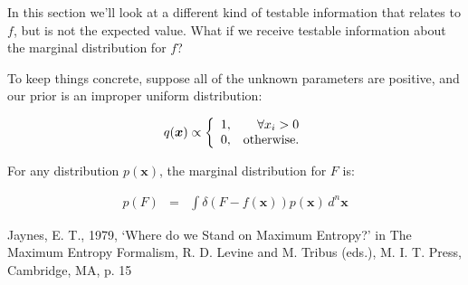 \documentclass[letterpaper, 11pt]{article}
\begin{document}
In this section we'll look at a different kind of testable information that
relates to $f$, but is not the expected value. What if we receive testable
information about the marginal distribution for $f$?

To keep things concrete, suppose all of the unknown parameters are positive,
and our prior is an improper uniform distribution:

\begin{eqnarray}
q(\boldsymbol{x}) \propto
\left\{
\begin{array}{lr}
1, & \forall x_i > 0\\
0, & \textnormal{otherwise}.
\end{array}
\right.
\end{eqnarray}

For any distribution $p(\boldsymbol{x})$, the marginal distribution for $F$ is:

\begin{eqnarray}
p(F) &=& \int \delta\left(F - f(\boldsymbol{x})\right)p(\boldsymbol{x}) \, d^n \boldsymbol{x}
\end{eqnarray}

\begin{thebibliography}{}
Jaynes, E. T., 1979, `Where do we Stand on Maximum Entropy?' in The Maximum Entropy Formalism, R. D. Levine and M. Tribus (eds.), M. I. T. Press, Cambridge, MA, p. 15
\end{thebibliography}
\end{document}
